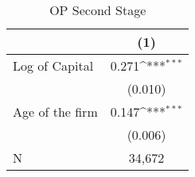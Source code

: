\begin{table}[htbp]\centering
\def\sym#1{\ifmmode^{#1}\else\(^{#1}\)\fi}
\caption{OP Second Stage \label{tab:q5c}}
\begin{tabular}{l*{1}{c}}
\toprule
                    &\multicolumn{1}{c}{(1)}         \\
\midrule
Log of Capital      &       0.271\sym{***}\\
                    &     (0.010)         \\
\addlinespace
Age of the firm     &       0.147\sym{***}\\
                    &     (0.006)         \\
\midrule
N                   &      34,672         \\
\bottomrule
\end{tabular}
\end{table}
